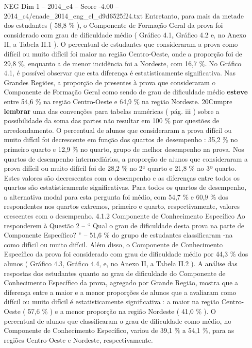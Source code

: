 \begin{textsample}{NEG Dim 1 – 2014\_c4 – Score -4.00 – 2014\_c4/enade\_2014\_eng\_el\_d9d6525f24.txt}
Entretanto, para mais da metade dos estudantes ( 58,8 \% ), o Componente de Formação Geral da prova foi considerado com grau de dificuldade médio ( Gráfico 4.1, Gráfico 4.2 e, no Anexo II, a Tabela II.1 ).
O percentual de estudantes que consideraram a prova como difícil ou muito difícil foi maior na região Centro-Oeste, onde a proporção foi de 29,8 \%, enquanto a de menor incidência foi a Nordeste, com 16,7 \%.
No Gráfico 4.1, é possível observar que esta diferença é estatisticamente significativa.
Nas Grandes Regiões, a proporção de presentes à prova que consideraram o Componente de Formação Geral como sendo de grau de dificuldade médio \textbf{esteve} entre 54,6 \% na região Centro-Oeste e 64,9 \% na região Nordeste. 20Cumpre \textbf{lembrar} uma das convenções para tabelas numéricas ( pág. iii ) sobre a possibilidade da soma das partes não resultar em 100 \% por questões de arredondamento.
O percentual de alunos que consideraram a prova difícil ou muito difícil foi decrescente em função dos quartos de desempenho : 35,2 \% no primeiro quarto e 12,9 \% no quarto, grupo de melhor desempenho na prova.
Nos quartos de desempenho intermediários, a proporção de alunos que consideraram a prova difícil ou muito difícil foi de 28,2 \% no 2º quarto e 21,8 \% no 3º quarto.
Estes valores são decrescentes com o desempenho e as diferenças entre todos os quartos são estatisticamente significativas.
Para todos os quartos de desempenho, a alternativa modal para esta pergunta foi médio, com 54,7 \% e 60,9 \% dos respondentes nos quartos extremos, primeiro e quarto, respectivamente, valores crescentes com o desempenho. 4.1.2 Componente de Conhecimento Específico Ao responderem à Questão 2 – “ Qual o grau de dificuldade desta prova na parte de Componente Específico? ” – 51,6 \% do grupo de estudantes classificaram -na como difícil ou muito difícil.
Além disso, o Componente de Conhecimento Específico da prova foi considerado com grau de dificuldade médio por 44,3 \% dos alunos ( Gráfico 4.3, Gráfico 4.4, e, no Anexo II, a Tabela II.2 ).
A análise das respostas dos estudantes quanto ao grau de dificuldade do Componente de Conhecimento Específico da prova, agregado por Grande Região, mostra que a diferença entre a maior e a menor proporções de alunos que a avaliaram como difícil ou muito difícil é estatisticamente significativa : a maior na região Centro-Oeste ( 57,6 \% ) e a menor proporção na região Nordeste ( 41,0 \% ).
O percentual de alunos que classificaram o grau de dificuldade como médio, no Componente de Conhecimento Específico, variou de 39,1 \% a 54,1 \%, para as regiões Centro-Oeste e Nordeste, respectivamente.

\end{textsample}
